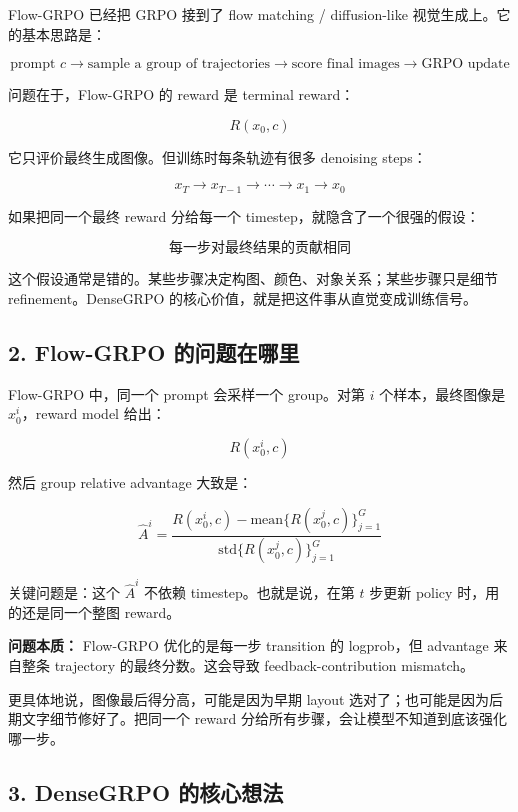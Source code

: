 Flow-GRPO 已经把 GRPO 接到了 flow matching / diffusion-like 视觉生成上。它的基本思路是：

\[
\text{prompt } c
\rightarrow
\text{sample a group of trajectories}
\rightarrow
\text{score final images}
\rightarrow
\text{GRPO update}
\]

问题在于，Flow-GRPO 的 reward 是 terminal reward：

\[
R(x_0, c)
\]

它只评价最终生成图像。但训练时每条轨迹有很多 denoising steps：

\[
x_T \rightarrow x_{T-1} \rightarrow \cdots \rightarrow x_1 \rightarrow x_0
\]

如果把同一个最终 reward 分给每一个 timestep，就隐含了一个很强的假设：

\[
\text{每一步对最终结果的贡献相同}
\]

这个假设通常是错的。某些步骤决定构图、颜色、对象关系；某些步骤只是细节 refinement。DenseGRPO 的核心价值，就是把这件事从直觉变成训练信号。

\subsection{2. Flow-GRPO 的问题在哪里}

Flow-GRPO 中，同一个 prompt 会采样一个 group。对第 \(i\) 个样本，最终图像是 \(x^i_0\)，reward model 给出：

\[
R(x^i_0, c)
\]

然后 group relative advantage 大致是：

\[
\hat{A}^i
=
\frac{
R(x^i_0,c)-\mathrm{mean}\{R(x^j_0,c)\}_{j=1}^{G}
}{
\mathrm{std}\{R(x^j_0,c)\}_{j=1}^{G}
}
\]

关键问题是：这个 \(\hat{A}^i\) 不依赖 timestep。也就是说，在第 \(t\) 步更新 policy 时，用的还是同一个整图 reward。

\begin{warnbox}
\textbf{问题本质：} Flow-GRPO 优化的是每一步 transition 的 logprob，但 advantage 来自整条 trajectory 的最终分数。这会导致 feedback-contribution mismatch。
\end{warnbox}

更具体地说，图像最后得分高，可能是因为早期 layout 选对了；也可能是因为后期文字细节修好了。把同一个 reward 分给所有步骤，会让模型不知道到底该强化哪一步。

\subsection{3. DenseGRPO 的核心想法}

